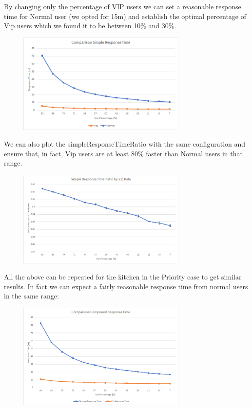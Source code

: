 
 By changing only the percentage of VIP users we can set a reasonable response time for Normal user (we opted for 15m) and establish the optimal percentage of Vip users which we found it to be between 10\% and 30\%.

\begin{figure}[H]
    \centering
    \includegraphics[width=0.75\textwidth]{figs/comparisonSimpleResponseTime.png}
\end{figure}

 We can also plot the simpleResponseTimeRatio with the same configuration and ensure that, in fact, Vip users are at least 80\% faster than Normal users in that range.

\begin{figure}[H]
    \centering
    \includegraphics[width=0.75\textwidth]{figs/simpleResponseTimeRatio.png}
\end{figure}

All the above can be repeated for the kitchen in the Priority case to get similar results. In fact we can expect a fairly reasonable response time from normal users in the same range:

\begin{figure}[H]
    \centering
    \includegraphics[width=0.75\textwidth]{figs/comparisonCompoundResponseTime.png}
\end{figure}

